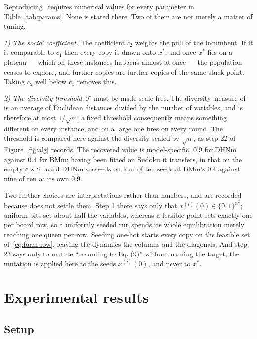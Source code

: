 \documentclass{easychair}
\newcommand{\citeref}[1]{\textcolor{academicpurple}{\cite{#1}}}
\newcommand{\tabref}[1]{\textcolor{academicpurple}{\hyperref[#1]{Table~\ref*{#1}}}}
\newcommand{\figref}[1]{\textcolor{academicpurple}{\hyperref[#1]{Figure~\ref*{#1}}}}
\begin{document}
Reproducing~\citeref{liwang2022} requires numerical values for every parameter in
\tabref{tab:params}. None is stated there. Two of them are not merely a matter of tuning.

\emph{1) The social coefficient.} The coefficient $c_2$ weights the pull of the incumbent. If it is
comparable to $c_1$ then every copy is drawn onto $x^{*}$, and once $x^{*}$ lies on a plateau --- which
on these instances happens almost at once --- the population ceases to explore, and further copies are
further copies of the same stuck point. Taking $c_2$ well below $c_1$ removes this.

\emph{2) The diversity threshold.} $\mathcal{T}$ must be made scale-free. The diversity measure
of~\citeref{liwang2022} is an average of Euclidean distances divided by the number of variables, and
is therefore at most $1/\sqrt{n}$; a fixed threshold consequently means something different on every
instance, and on a large one fires on every round. The threshold is compared here against the
diversity scaled by $\sqrt{n}$, as step 22 of \figref{fig:alg} records. The recovered value is
model-specific, $0.9$ for DHNm against $0.4$ for BMm; having been fitted on Sudoku it transfers, in
that on the empty $8\times8$ board DHNm succeeds on four of ten seeds at BMm's $0.4$ against nine of
ten at its own $0.9$.

Two further choices are interpretations rather than numbers, and are recorded because
\citeref{liwang2022} does not settle them. Step 1 there says only that
$x^{(i)}(0) \in \{0,1\}^{n^2}$; uniform bits set about half the variables, whereas a feasible point
sets exactly one per board row, so a uniformly seeded run spends its whole equilibration merely
reaching one queen per row. Seeding one-hot starts every copy on the feasible set
of~\eqref{eq:form-row}, leaving the dynamics the columns and the diagonals. And step 23 says only to
mutate \enquote{according to Eq. (9)} without naming the target; the mutation is applied here to the
seeds $x^{(i)}(0)$, and never to $x^{*}$.

\section{Experimental results}\label{sec:exp}

\subsection{Setup}\label{sec:setup}
\end{document}
